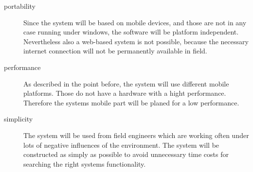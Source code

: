 \begin{description}
\item[portability] Since the system will be based on mobile devices, and those are not in any case running under windows, the software will be platform independent. Nevertheless also a web-based system is not possible, because the necessary internet connection will not be permanently available in field.
\item[performance] As described in the point before, the system will use different mobile platforms. Those do not have a hardware with a hight performance. Therefore the systems mobile part will be planed for a low performance.
\item[simplicity] The system will be used from field engineers which are working often under lots of negative influences of the environment. The system will be constructed as simply as possible to avoid unnecessary time costs for searching the right systems functionality.

\end{description}

